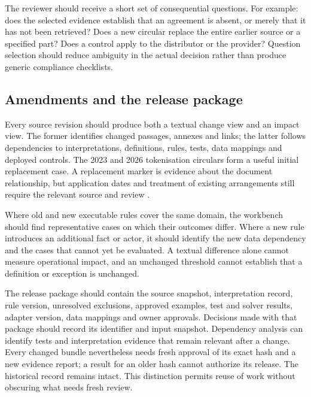 The reviewer should receive a short set of consequential questions. For example:
does the selected evidence establish that an agreement is absent, or merely that
it has not been retrieved? Does a new circular replace the entire earlier source
or a specified part? Does a control apply to the distributor or the provider?
Question selection should reduce ambiguity in the actual decision rather than
produce generic compliance checklists.

\subsection{Amendments and the release package}

Every source revision should produce both a textual change view and an impact
view. The former identifies changed passages, annexes and links; the latter
follows dependencies to interpretations, definitions, rules, tests, data mappings
and deployed controls. The 2023 and 2026 tokenisation circulars form a useful
initial replacement case. A replacement marker is evidence about the document
relationship, but application dates and treatment of existing arrangements still
require the relevant source and review \citep{sfctoken2023,sfctoken2026}.

Where old and new executable rules cover the same domain, the workbench should
find representative cases on which their outcomes differ. Where a new rule
introduces an additional fact or actor, it should identify the new data dependency
and the cases that cannot yet be evaluated. A textual difference alone cannot
measure operational impact, and an unchanged threshold cannot establish that a
definition or exception is unchanged.

The release package should contain the source snapshot, interpretation record,
rule version, unresolved exclusions, approved examples, test and solver results,
adapter version, data mappings and owner approvals. Decisions made with that
package should record its identifier and input snapshot. Dependency analysis can
identify tests and interpretation evidence that remain relevant after a change.
Every changed bundle nevertheless needs fresh approval of its exact hash and a
new evidence report; a result for an older hash cannot authorize its release.
The historical record remains intact. This distinction permits reuse of work
without obscuring what needs fresh review.
